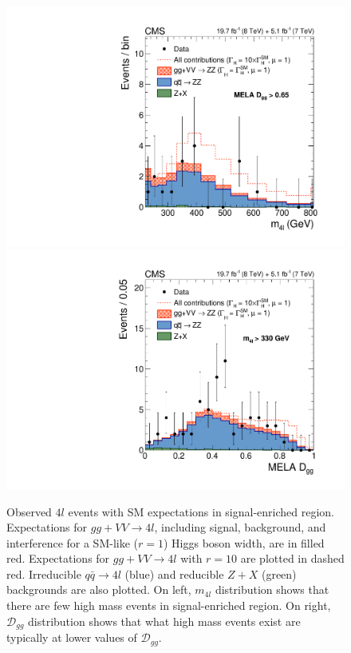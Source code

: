 \begin{figure}[htbp]
\begin{center}
\includegraphics[width=.45\linewidth]{HiggsProperties/figures/fig3a_new.pdf}
\includegraphics[width=.45\linewidth]{HiggsProperties/figures/fig3b_new.pdf}
\caption[$m_{4l}$ and $\mathcal{D}_{gg}$ Distributions of Expected and Observed $4l$ Events in the Off-Shell Signal-Enhanced Region]{Observed $4l$ events with SM expectations in signal-enriched region. Expectations for $gg+VV\rightarrow 4l$, including signal, background, and interference for a SM-like ($r=1$) Higgs boson width, are in filled red. Expectations for $gg+VV\rightarrow 4l$ with $r=10$ are plotted in dashed red. Irreducible $q\bar{q}\rightarrow 4l$ (blue) and reducible $Z+X$ (green) backgrounds are also plotted. On left, $m_{4l}$ distribution shows that there are few high mass events in signal-enriched region. On right, $\mathcal{D}_{gg}$ distribution shows that what high mass events exist are typically at lower values of $\mathcal{D}_{gg}$.}
\label{fig:Width4l_SignalEnriched}
\end{center}
\end{figure}

